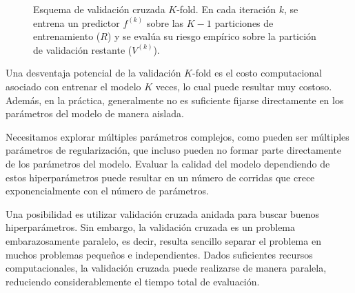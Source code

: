 \begin{figure}[htbp]
	\caption{Esquema de validación cruzada $K$-fold. En cada iteración $k$, se entrena un predictor $f^{(k)}$ sobre las $K-1$ particiones de entrenamiento ($R$) y se evalúa su riesgo empírico sobre la partición de validación restante ($V^{(k)}$).}
	\label{fig:kfold_cv}
\end{figure}


Una desventaja potencial de la validación $K$-fold es el costo computacional asociado con entrenar el modelo $K$ veces, lo cual puede resultar muy costoso. Además, en la práctica, generalmente no es suficiente fijarse directamente en los parámetros del modelo de manera aislada.

Necesitamos explorar múltiples parámetros complejos, como pueden ser múltiples parámetros de regularización, que incluso pueden no formar parte directamente de los parámetros del modelo. Evaluar la calidad del modelo dependiendo de estos hiperparámetros puede resultar en un número de corridas que crece exponencialmente con el número de parámetros.

Una posibilidad es utilizar validación cruzada anidada para buscar buenos hiperparámetros. Sin embargo, la validación cruzada es un problema embarazosamente paralelo, es decir, resulta sencillo separar el problema en muchos problemas pequeños e independientes. Dados suficientes recursos computacionales, la validación cruzada puede realizarse de manera paralela, reduciendo considerablemente el tiempo total de evaluación.

